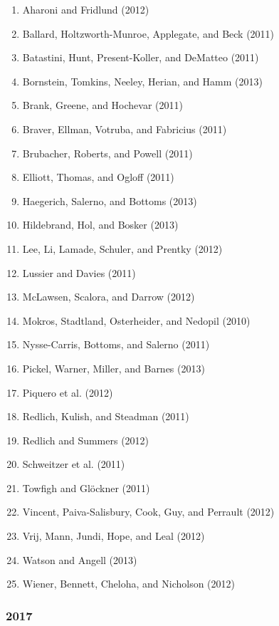 \documentclass[english,man]{apa6}
\providecommand{\tightlist}{%
  \setlength{\itemsep}{0pt}\setlength{\parskip}{0pt}}
\theoremstyle{definition}
\theoremstyle{definition}
\theoremstyle{definition}
\theoremstyle{remark}
\begin{document}
\begin{enumerate}
\def\labelenumi{\arabic{enumi})}
\tightlist
\item
  Aharoni and Fridlund (2012)
\item
  Ballard, Holtzworth-Munroe, Applegate, and Beck (2011)
\item
  Batastini, Hunt, Present-Koller, and DeMatteo (2011)
\item
  Bornstein, Tomkins, Neeley, Herian, and Hamm (2013)
\item
  Brank, Greene, and Hochevar (2011)
\item
  Braver, Ellman, Votruba, and Fabricius (2011)
\item
  Brubacher, Roberts, and Powell (2011)
\item
  Elliott, Thomas, and Ogloff (2011)
\item
  Haegerich, Salerno, and Bottoms (2013)
\item
  Hildebrand, Hol, and Bosker (2013)
\item
  Lee, Li, Lamade, Schuler, and Prentky (2012)
\item
  Lussier and Davies (2011)
\item
  McLawsen, Scalora, and Darrow (2012)
\item
  Mokros, Stadtland, Osterheider, and Nedopil (2010)
\item
  Nysse-Carris, Bottoms, and Salerno (2011)
\item
  Pickel, Warner, Miller, and Barnes (2013)
\item
  Piquero et al. (2012)
\item
  Redlich, Kulish, and Steadman (2011)
\item
  Redlich and Summers (2012)
\item
  Schweitzer et al. (2011)
\item
  Towfigh and Glöckner (2011)
\item
  Vincent, Paiva-Salisbury, Cook, Guy, and Perrault (2012)
\item
  Vrij, Mann, Jundi, Hope, and Leal (2012)
\item
  Watson and Angell (2013)
\item
  Wiener, Bennett, Cheloha, and Nicholson (2012)
\end{enumerate}

\subsubsection{2017}\label{section-27}
\end{document}
